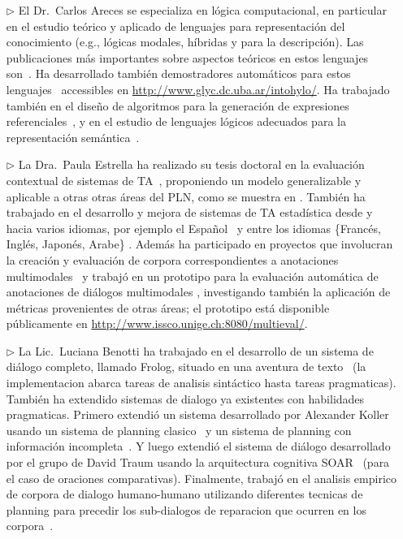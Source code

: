 \begin{itemize}

\item[$\triangleright$] El Dr.\ Carlos Areces se especializa en l\'ogica computacional,
en particular en el estudio te\'orico y aplicado de lenguajes para
representaci\'on del conocimiento (e.g., l\'ogicas modales, h\'ibridas y
para la descripci\'on).  Las publicaciones
m\'as importantes sobre aspectos te\'oricos en estos lenguajes
son~\citep{ABM01,arec:hybr05b}.  Ha desarrollado tambi\'en demostradores
autom\'aticos para estos lenguajes~\citep{ANR01,arec:hylo02a,AG06,Hoffmann2007}
accessibles en \url{http://www.glyc.dc.uba.ar/intohylo/}.
Ha trabajado tambi\'en en el dise\~no de algoritmos para la generaci\'on de
expresiones referenciales~\citep{AKS08}, y en el estudio de lenguajes l\'ogicos
adecuados para la representaci\'on sem\'antica~\citep{AF08}.

\item[$\triangleright$] La Dra.\ Paula Estrella ha realizado su tesis doctoral en la evaluaci\'on contextual de sistemas de TA~\citep{estr:impr08, estr:femt09}, proponiendo un modelo generalizable y aplicable a otras otras \'areas del PLN, como se muestra en \citep{Miller2008}. Tambi\'en ha trabajado en el desarrollo y mejora de sistemas de TA estad\'istica desde y hacia varios idiomas, por ejemplo el Espa\~nol~\citep{estr:expe05} y entre los idiomas \{Franc\'es, Ingl\'es, Japon\'es, Arabe\} \citep{rayner-EtAl:2009:GEAF}. Adem\'as ha participado en proyectos que involucran la creaci\'on y evaluaci\'on de corpora correspondientes a anotaciones multimodales~\citep{pope:estr07} y trabaj\'o en un prototipo para la evaluaci\'on autom\'atica de anotaciones de di\'alogos multimodales \citep{multieval}, investigando tambi\'en la aplicaci\'on de m\'etricas provenientes de otras \'areas; el prototipo est\'a disponible p\'ublicamente en \url{http://www.issco.unige.ch:8080/multieval/}.


\item[$\triangleright$] La Lic.\ Luciana Benotti ha trabajado en el desarrollo de un sistema de
di\'alogo completo, llamado Frolog, situado en una aventura de
texto~\citep{benotti09b} (la implementacion abarca tareas de analisis
sint\'actico hasta tareas pragmaticas). Tambi\'en ha extendido sistemas de
dialogo ya existentes con habilidades pragmaticas. Primero extendi\'o un
sistema desarrollado por Alexander Koller~\citep{koller04} usando un sistema de
planning clasico~\citep{benotti07} y un sistema de planning con informaci\'on
incompleta~\citep{benotti08}. Y luego extendi\'o el sistema de di\'alogo
desarrollado por el grupo de David Traum usando la arquitectura cognitiva
SOAR~\citep{benotti09a} (para el caso de oraciones comparativas). Finalmente,
trabaj\'o en el analisis empirico de corpora de dialogo humano-humano utilizando
diferentes tecnicas de planning para precedir los sub-dialogos de reparacion que
ocurren en los corpora~\citep{benotti09c}.

\end{itemize}

